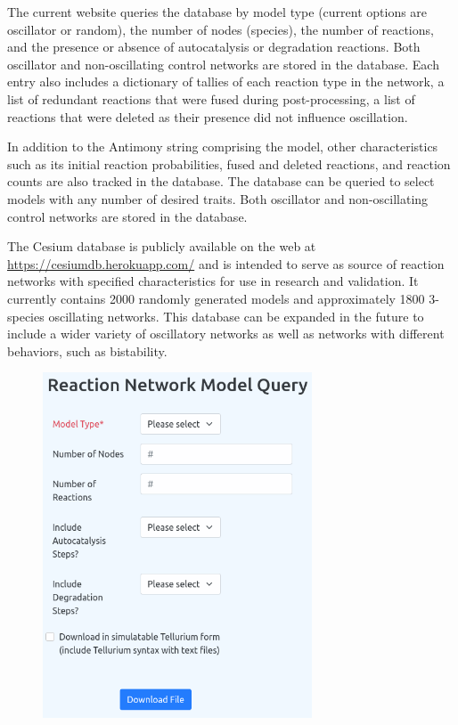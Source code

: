 \documentclass[12pt]{report}
\begin{document}
The current website queries the database by model type (current options are oscillator or random), the number of nodes (species), the number of reactions, and the presence or absence of autocatalysis or degradation reactions. Both oscillator and non-oscillating control networks are stored in the database. Each entry also includes a dictionary of tallies of each reaction type in the network, a list of redundant reactions that were fused during post-processing, a list of reactions that were deleted as their presence did not influence oscillation. 




In addition to the Antimony string comprising the model, other characteristics such as its initial reaction probabilities, fused and deleted reactions, and reaction counts are also tracked in the database.  The database can be queried to select models with any number of desired traits. Both oscillator and non-oscillating control networks are stored in the database.

The Cesium database is publicly available on the web at \url{https://cesiumdb.herokuapp.com/} and is intended to serve as source of reaction networks with specified characteristics for use in research and validation.  It currently contains 2000 randomly generated models and approximately 1800 3-species oscillating networks. This database can be expanded in the future to include a wider variety of oscillatory networks as well as networks with different behaviors, such as bistability. 

\begin{figure}
    \centering
    \includegraphics[width=8cm]{images/website.png}
    \label{fig:website}
\end{figure}
\end{document}
